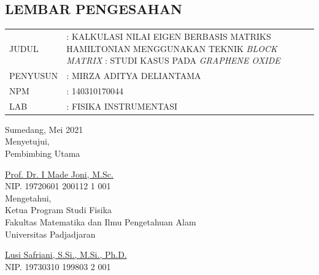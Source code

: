 \documentclass[12pt,a4paper]{report}
\begin{document}
\begin{onehalfspacing}

\chapter*{\centering LEMBAR PENGESAHAN}
\thispagestyle{empty}
\begin{tabular}{p{3cm}p{11cm}}
JUDUL	  & : KALKULASI NILAI EIGEN BERBASIS MATRIKS HAMILTONIAN MENGGUNAKAN TEKNIK \textit{BLOCK MATRIX} : STUDI KASUS PADA \textit{GRAPHENE OXIDE} \\
PENYUSUN  & : MIRZA ADITYA DELIANTAMA \\
NPM  & : 140310170044 \\
LAB  & : FISIKA INSTRUMENTASI \\
\end{tabular}
\vspace{1cm}
\begin{center}
Sumedang, Mei 2021 \\
Menyetujui, \\
\vspace{0.75cm}
Pembimbing Utama \\
\vspace{2cm}


\underline{Prof. Dr. I Made Joni, M.Sc.} \\
NIP. 19720601 200112 1 001 \\
\vspace{1cm}
Mengetahui, \\
Ketua Program Studi Fisika \\
Fakultas Matematika dan Ilmu Pengetahuan Alam \\
Universitas Padjadjaran \\
\vspace{2cm}

\underline{Lusi Safriani, S.Si., M.Si., Ph.D.} \\
NIP. 19730310 199803 2 001 \\

\end{center}
\end{onehalfspacing}
\end{document}

